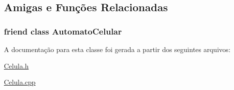 \subsection{Amigas e Funções Relacionadas}
\hypertarget{class_celula_a6e5b914f395a9ce47844104b9b750dde}{
\subsubsection[{AutomatoCelular}]{\setlength{\rightskip}{0pt plus 5cm}friend class {\bf AutomatoCelular}}}
\label{class_celula_a6e5b914f395a9ce47844104b9b750dde}


A documentação para esta classe foi gerada a partir dos seguintes arquivos:\begin{DoxyCompactItemize}
\item 
\hyperlink{_celula_8h}{Celula.h}\item 
\hyperlink{_celula_8cpp}{Celula.cpp}\end{DoxyCompactItemize}
